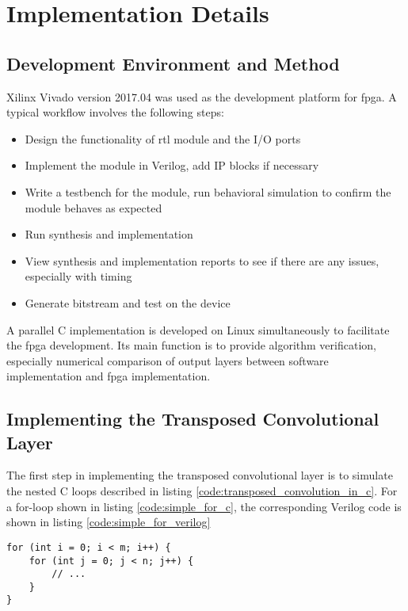 
\chapter{Implementation Details}

\section{Development Environment and Method}

Xilinx Vivado version 2017.04 was used as the development platform for \gls{fpga}. A typical workflow involves
the following steps:

\begin{itemize}
  \item Design the functionality of \gls{rtl} module and the I/O ports
  \item Implement the module in Verilog, add IP blocks if necessary
  \item Write a testbench for the module, run behavioral simulation to confirm the module behaves as
    expected
  \item Run synthesis and implementation
  \item View synthesis and implementation reports to see if there are any issues, especially with timing
  \item Generate bitstream and test on the device
\end{itemize}

    A parallel C implementation is developed on Linux simultaneously to facilitate the \gls{fpga} development.
Its main function is to provide algorithm verification, especially numerical comparison of output layers
    between software implementation and \gls{fpga} implementation.

\section{Implementing the Transposed Convolutional Layer}

The first step in implementing the transposed convolutional layer is to simulate the nested C loops
described in listing \ref{code:transposed_convolution_in_c}. For a for-loop shown in listing
\ref{code:simple_for_c}, the corresponding Verilog code is shown in listing \ref{code:simple_for_verilog}

\begin{code}
\begin{verbatim}
for (int i = 0; i < m; i++) {
    for (int j = 0; j < n; j++) {
        // ...
    }
}
\end{verbatim}
\label{code:simple_for_c}
\end{code}

